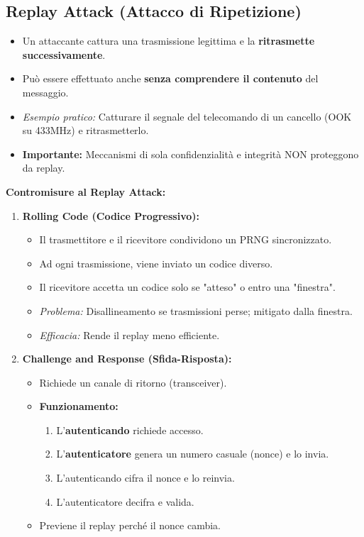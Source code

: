 \documentclass{article}
\begin{document}
\subsection{Replay Attack (Attacco di Ripetizione)}
\begin{itemize}
    \item Un attaccante cattura una trasmissione legittima e la \textbf{ritrasmette successivamente}.
    \item Può essere effettuato anche \textbf{senza comprendere il contenuto} del messaggio.
    \item \textit{Esempio pratico:} Catturare il segnale del telecomando di un cancello (OOK su 433MHz) e ritrasmetterlo.
    \item \textbf{Importante:} Meccanismi di sola confidenzialità e integrità NON proteggono da replay.
\end{itemize}
\textbf{Contromisure al Replay Attack:}
\begin{enumerate}
    \item \textbf{Rolling Code (Codice Progressivo):}
    \begin{itemize}
        \item Il trasmettitore e il ricevitore condividono un PRNG sincronizzato.
        \item Ad ogni trasmissione, viene inviato un codice diverso.
        \item Il ricevitore accetta un codice solo se "atteso" o entro una "finestra".
        \item \textit{Problema:} Disallineamento se trasmissioni perse; mitigato dalla finestra.
        \item \textit{Efficacia:} Rende il replay meno efficiente.
    \end{itemize}
    \item \textbf{Challenge and Response (Sfida-Risposta):}
    \begin{itemize}
        \item Richiede un canale di ritorno (transceiver).
        \item \textbf{Funzionamento:}
        \begin{enumerate}
            \item L'\textbf{autenticando} richiede accesso.
            \item L'\textbf{autenticatore} genera un numero casuale (nonce) e lo invia.
            \item L'autenticando cifra il nonce e lo reinvia.
            \item L'autenticatore decifra e valida.
        \end{enumerate}
        \item Previene il replay perché il nonce cambia.
    \end{itemize}
\end{enumerate}
\end{document}
